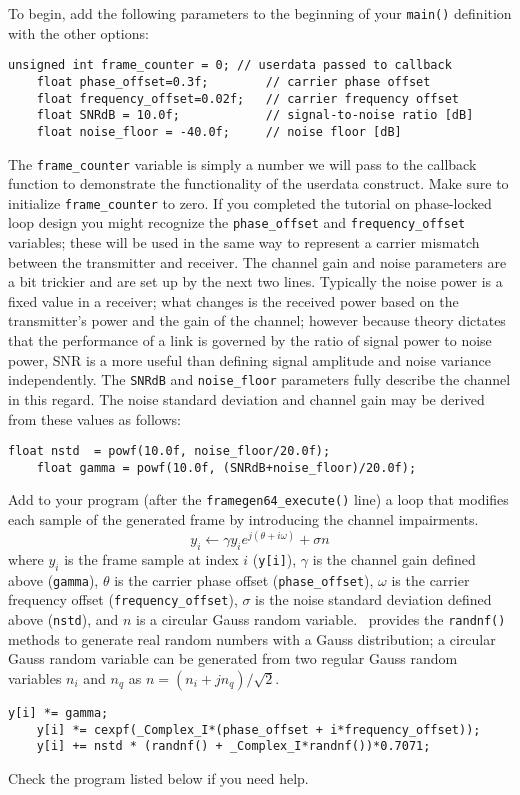 To begin, add the following parameters to the beginning of your
{\tt main()} definition with the other options:
%
\begin{Verbatim}[fontsize=\small]
    unsigned int frame_counter = 0; // userdata passed to callback
    float phase_offset=0.3f;        // carrier phase offset
    float frequency_offset=0.02f;   // carrier frequency offset
    float SNRdB = 10.0f;            // signal-to-noise ratio [dB]
    float noise_floor = -40.0f;     // noise floor [dB]
\end{Verbatim}
%
The {\tt frame\_counter} variable is simply a number we will pass to the
callback function to demonstrate the functionality of the userdata
construct.
Make sure to initialize {\tt frame\_counter} to zero.
%
If you completed the tutorial on phase-locked loop design you might
recognize the {\tt phase\_offset} and {\tt frequency\_offset} variables;
these will be used in the same way to represent a carrier mismatch
between the transmitter and receiver.
%
The channel gain and noise parameters are a bit trickier and are set up
by the next two lines.
Typically the noise power is a fixed value in a receiver;
what changes is the received power based on the transmitter's power and
the gain of the channel;
however because theory dictates that the performance of a link is
governed by the ratio of signal power to noise power,
SNR is a more useful than defining signal amplitude and noise variance
independently.
The {\tt SNRdB} and {\tt noise\_floor} parameters fully describe the
channel in this regard.
The noise standard deviation and channel gain may be derived from these
values as follows:
%
\begin{Verbatim}[fontsize=\small]
    float nstd  = powf(10.0f, noise_floor/20.0f);
    float gamma = powf(10.0f, (SNRdB+noise_floor)/20.0f);
\end{Verbatim}
%
Add to your program
(after the {\tt framegen64\_execute()} line)
a loop that modifies each sample of the generated frame by introducing
the channel impairments.
%
\[
    y_i \leftarrow \gamma y_i e^{j(\theta + i\omega)} + \sigma n
\]
%
where
$y_i$ is the frame sample at index $i$ ({\tt y[i]}),
$\gamma$ is the channel gain defined above ({\tt gamma}),
$\theta$ is the carrier phase offset ({\tt phase\_offset}),
$\omega$ is the carrier frequency offset ({\tt frequency\_offset}),
$\sigma$ is the noise standard deviation defined above ({\tt nstd}), and
$n$ is a circular Gauss random variable.
\liquid\ provides the {\tt randnf()} methods to
generate real random numbers with a Gauss distribution;
a circular Gauss random variable can be generated from two regular Gauss
random variables $n_i$ and $n_q$ as $n = (n_i + jn_q)/\sqrt{2}$.
%
\begin{Verbatim}[fontsize=\small]
    y[i] *= gamma;
    y[i] *= cexpf(_Complex_I*(phase_offset + i*frequency_offset));
    y[i] += nstd * (randnf() + _Complex_I*randnf())*0.7071;
\end{Verbatim}
%
Check the program listed below if you need help.

